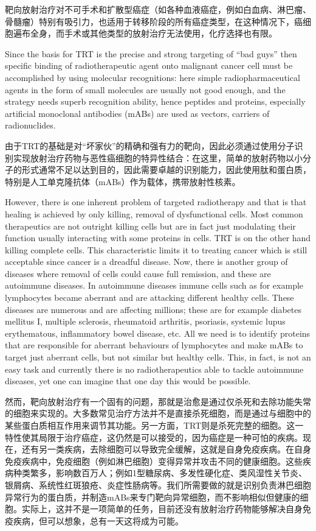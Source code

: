 \documentclass[dvipsnames, svgnames,a4paper,11pt]{article}
\begin{document}
靶向放射治疗对不可手术和扩散型癌症（如各种血液癌症，例如白血病、淋巴瘤、骨髓瘤）特别有吸引力，也适用于转移阶段的所有癌症类型，在这种情况下，癌细胞遍布全身，而手术或其他类型的放射治疗无法使用，化疗选择也有限。

Since the basis for TRT is the precise and strong targeting of “bad guys” then specific binding of radiotherapeutic agent onto malignant cancer cell must be accomplished by using molecular recognitions: here simple radiopharmaceutical agents in the form of small molecules are usually not good enough, and the strategy needs superb recognition ability, hence peptides and proteins, especially artificial monoclonal antibodies (mABs) are used as vectors, carriers of radionuclides.

由于TRT的基础是对“坏家伙”的精确和强有力的靶向，因此必须通过使用分子识别实现放射治疗药物与恶性癌细胞的特异性结合：在这里，简单的放射药物以小分子的形式通常不足以达到目的，因此需要卓越的识别能力，因此使用肽和蛋白质，特别是人工单克隆抗体（mABs）作为载体，携带放射性核素。

However, there is one inherent problem of targeted radiotherapy and that is that healing is achieved by only killing, removal of dysfunctional cells. Most common therapeutics are not outright killing cells but are in fact just modulating their function usually interacting with some proteins in cells. TRT is on the other hand killing complete cells. This characteristic limits it to treating cancer which is still acceptable since cancer is a dreadful disease. Now, there is another group of diseases where removal of cells could cause full remission, and these are autoimmune diseases. In autoimmune diseases immune cells such as for example lymphocytes became aberrant and are attacking different healthy cells. These diseases are numerous and are affecting millions; these are for example diabetes mellitus I, multiple sclerosis, rheumatoid arthritis, psoriasis, systemic lupus erythematous, inflammatory bowel disease, etc. All we need is to identify proteins that are responsible for aberrant behaviours of lymphocytes and make mABs to target just aberrant cells, but not similar but healthy cells. This, in fact, is not an easy task and currently there is no radiotherapeutics able to tackle autoimmune diseases, yet one can imagine that one day this would be possible.

然而，靶向放射治疗有一个固有的问题，那就是治愈是通过仅杀死和去除功能失常的细胞来实现的。大多数常见治疗方法并不是直接杀死细胞，而是通过与细胞中的某些蛋白质相互作用来调节其功能。另一方面，TRT则是杀死完整的细胞。这一特性使其局限于治疗癌症，这仍然是可以接受的，因为癌症是一种可怕的疾病。现在，还有另一类疾病，去除细胞可以导致完全缓解，这就是自身免疫疾病。在自身免疫疾病中，免疫细胞（例如淋巴细胞）变得异常并攻击不同的健康细胞。这些疾病种类繁多，影响数百万人；例如1型糖尿病、多发性硬化症、类风湿性关节炎、银屑病、系统性红斑狼疮、炎症性肠病等。我们所需要做的就是识别负责淋巴细胞异常行为的蛋白质，并制造mABs来专门靶向异常细胞，而不影响相似但健康的细胞。实际上，这并不是一项简单的任务，目前还没有放射治疗药物能够解决自身免疫疾病，但可以想象，总有一天这将成为可能。
\end{document}
